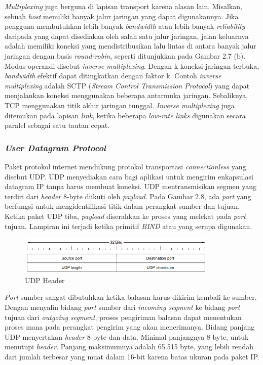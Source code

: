 \emph{Multiplexing} juga berguna di lapisan transport karena alasan lain. Misalkan, sebuah \emph{host} memiliki banyak jalur jaringan yang dapat digunakannya. Jika pengguna membutuhkan lebih banyak \emph{bandwidth} atau lebih banyak \emph{reliability} daripada yang dapat disediakan oleh salah satu jalur jaringan, jalan keluarnya adalah memiliki koneksi yang mendistribusikan lalu lintas di antara banyak jalur jaringan dengan basis \emph{round-robin}, seperti ditunjukkan pada Gambar 2.7 (b). Modus operandi disebut \emph{inverse multiplexing}. Dengan k koneksi jaringan terbuka, \emph{bandwidth} efektif dapat ditingkatkan dengan faktor k. Contoh \emph{inverse multiplexing} adalah SCTP (\emph{Stream Control Transmission Protocol}) yang dapat menjalankan koneksi menggunakan beberapa antarmuka jaringan. Sebaliknya, TCP menggunakan titik akhir jaringan tunggal. \emph{Inverse multiplexing} juga ditemukan pada lapisan \emph{link}, ketika beberapa \emph{low-rate links} digunakan secara paralel sebagai satu tautan cepat.

\subsubsection{\emph{User Datagram Protocol}}

Paket protokol internet mendukung protokol transportasi \emph{connectionless} yang disebut UDP. UDP menyediakan cara bagi aplikasi untuk mengirim enkapsulasi datagram IP tanpa harus membuat koneksi. UDP mentransmisikan segmen yang terdiri dari \emph{header} 8-byte diikuti oleh \emph{payload}. Pada Gambar 2.8, ada \emph{port} yang berfungsi untuk mengidentifikasi titik dalam perangkat sumber dan tujuan. Ketika paket UDP tiba, \emph{payload} diserahkan ke proses yang melekat pada \emph{port} tujuan. Lampiran ini terjadi ketika primitif \emph{BIND} atau yang serupa digunakan.

\begin{figure}[H]
  \centering{}
	\includegraphics[width=0.85\textwidth]{gambar/the_UDP_header}
  \caption{UDP Header}
\end{figure}

\emph{Port} sumber sangat dibutuhkan ketika balasan harus dikirim kembali ke sumber. Dengan menyalin bidang \emph{port} sumber dari \emph{incoming segment} ke bidang \emph{port} tujuan dari \emph{outgoing segment}, proses pengiriman balasan dapat menentukan proses mana pada perangkat pengirim yang akan menerimanya. Bidang panjang UDP menyertakan \emph{header} 8-byte dan data. Minimal panjangnya 8 byte, untuk menutupi \emph{header}. Panjang maksimumnya adalah 65.515 byte, yang lebih rendah dari jumlah terbesar yang muat dalam 16-bit karena batas ukuran pada paket IP.

